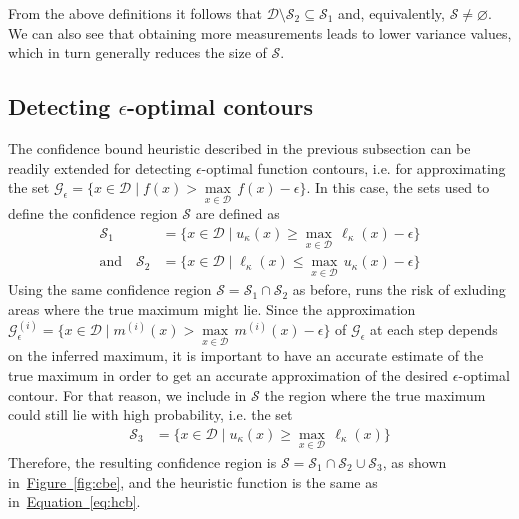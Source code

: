 \documentclass[11pt]{article} %
\newcommand{\figref}[1]{\hyperref[#1]{\mbox{Figure~\ref*{#1}}}}
\newcommand{\eqtref}[1]{\hyperref[#1]{\mbox{Equation~\ref*{#1}}}}
\begin{document}
From the above definitions it follows that 
$\mathcal{D}\setminus\mathcal{S}_2\subseteq\mathcal{S}_1$
and, equivalently, $\mathcal{S}\neq\varnothing$. We can also see that
obtaining more measurements leads to lower variance values, which in turn
generally reduces the size of $\mathcal{S}$.

\subsection{Detecting $\epsilon$-optimal contours}
The confidence bound heuristic described in the previous subsection can be
readily extended for detecting $\epsilon$-optimal function contours,
i.e. for approximating the set
${\mathcal{G}_{\epsilon} = \{x \in \mathcal{D} \mid f(x) > \underset{x \in \mathcal{D}}{\max}\,f(x) - \epsilon\}}$.
In this case, the sets used to define the confidence region $\mathcal{S}$
are defined as
\begin{align*}
  \mathcal{S}_1 &= \{x \in \mathcal{D} \mid u_{\kappa}(x) \geq \underset{x \in \mathcal{D}}{\max}\,\ell_{\kappa}(x) - \epsilon\}\\
  \text{and}\hspace{1em}
  \mathcal{S}_2 &= \{x \in \mathcal{D} \mid \ell_{\kappa}(x) \leq \underset{x \in \mathcal{D}}{\max}\,u_{\kappa}(x) - \epsilon\}
\end{align*}
Using the same confidence region $\mathcal{S} = \mathcal{S}_1\cap\mathcal{S}_2$
as before, runs the risk of exluding areas where the true maximum might lie.
Since the approximation
${\mathcal{G}^{(i)}_\epsilon = \{x \in \mathcal{D} \mid m^{(i)}(x) > \underset{x \in \mathcal{D}}{\max}\,m^{(i)}(x) - \epsilon\}}$
of $\mathcal{G}_{\epsilon}$ at each step
depends on the inferred maximum, it is important to have an accurate estimate
of the true maximum in order to get an accurate approximation of the desired
$\epsilon$-optimal contour. For that reason, we include in $\mathcal{S}$ the
region where the true maximum could still lie with high probability, i.e.
the set
\begin{align*}
  \mathcal{S}_3 &= \{x \in \mathcal{D} \mid u_{\kappa}(x) \geq \underset{x \in \mathcal{D}}{\max}\,\ell_{\kappa}(x)\}
\end{align*}
Therefore, the resulting confidence region is
$\mathcal{S} = \mathcal{S}_1\cap\mathcal{S}_2\cup\mathcal{S}_3$, as shown
in~\figref{fig:cbe}, and the heuristic function is the same as
in~\eqtref{eq:hcb}.
\end{document}

